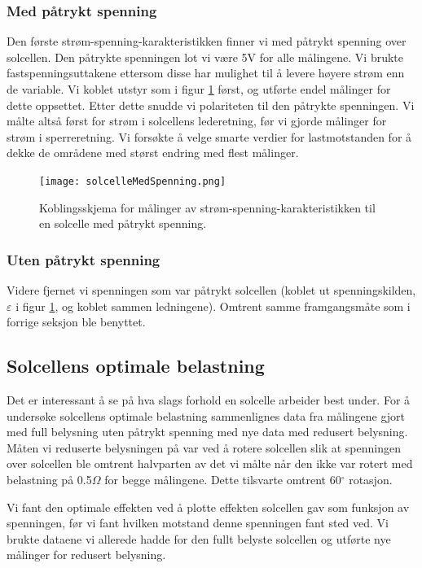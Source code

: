 \documentclass[a4paper,11pt, twocolumn]{article}
\begin{document}
\subsubsection{Med påtrykt spenning}
Den første strøm-spenning-karakteristikken finner vi med påtrykt spenning over solcellen. Den påtrykte spenningen lot vi være 5V for alle målingene. Vi brukte fastspenningsuttakene ettersom disse har mulighet til å levere høyere strøm enn de variable. Vi koblet utstyr som i figur \ref{fig:solcelleMedSpenning} først, og utførte endel målinger for dette oppsettet. Etter dette snudde vi polariteten til den påtrykte spenningen. Vi målte altså først for strøm i solcellens lederetning, før vi gjorde målinger for strøm i sperreretning. Vi forsøkte å velge smarte verdier for lastmotstanden for å dekke de områdene med størst endring med flest målinger.

\begin{figure}[!ht]
	\texttt{[image: solcelleMedSpenning.png]}
	\caption{Koblingsskjema for målinger av strøm-spenning-karakteristikken til en solcelle med påtrykt spenning.}
	\label{fig:solcelleMedSpenning}
\end{figure}

\subsubsection{Uten påtrykt spenning}
Videre fjernet vi spenningen som var påtrykt solcellen (koblet ut spenningskilden, $\varepsilon$ i figur \ref{fig:solcelleMedSpenning}, og koblet sammen ledningene). Omtrent samme framgangsmåte som i forrige seksjon ble benyttet.
\subsection{Solcellens optimale belastning}
Det er interessant å se på hva slags forhold en solcelle arbeider best under.
For å undersøke solcellens optimale belastning sammenlignes data fra målingene gjort med full belysning uten påtrykt spenning med nye data med redusert belysning. Måten vi reduserte belysningen på var ved å rotere solcellen slik at spenningen over solcellen ble omtrent halvparten av det vi målte når den ikke var rotert med belastning på 0.5$\Omega$ for begge målingene. Dette tilsvarte omtrent 60$^\circ$ rotasjon.

Vi fant den optimale effekten ved å plotte effekten solcellen gav som funksjon av spenningen, før vi fant hvilken motstand denne spenningen fant sted ved. Vi brukte dataene vi allerede hadde for den fullt belyste solcellen og utførte nye målinger for redusert belysning.
\end{document}
